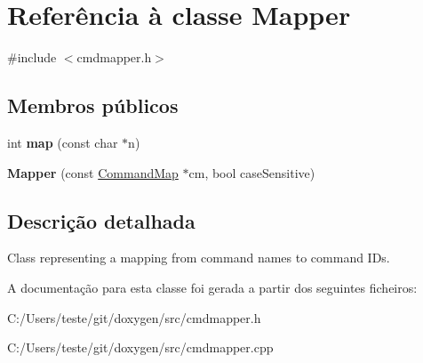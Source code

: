 \hypertarget{class_mapper}{\section{Referência à classe Mapper}
\label{class_mapper}
}


{\ttfamily \#include $<$cmdmapper.\-h$>$}

\subsection*{Membros públicos}
\begin{DoxyCompactItemize}
\item 
\hypertarget{class_mapper_ac98509cac817b369f60a3cc909431528}{int {\bfseries map} (const char $\ast$n)}\label{class_mapper_ac98509cac817b369f60a3cc909431528}

\item 
\hypertarget{class_mapper_affdbd3a19becc7066733f8812fd3bde5}{{\bfseries Mapper} (const \hyperlink{struct_command_map}{Command\-Map} $\ast$cm, bool case\-Sensitive)}\label{class_mapper_affdbd3a19becc7066733f8812fd3bde5}

\end{DoxyCompactItemize}


\subsection{Descrição detalhada}
Class representing a mapping from command names to command I\-Ds. 

A documentação para esta classe foi gerada a partir dos seguintes ficheiros\-:\begin{DoxyCompactItemize}
\item 
C\-:/\-Users/teste/git/doxygen/src/cmdmapper.\-h\item 
C\-:/\-Users/teste/git/doxygen/src/cmdmapper.\-cpp\end{DoxyCompactItemize}
